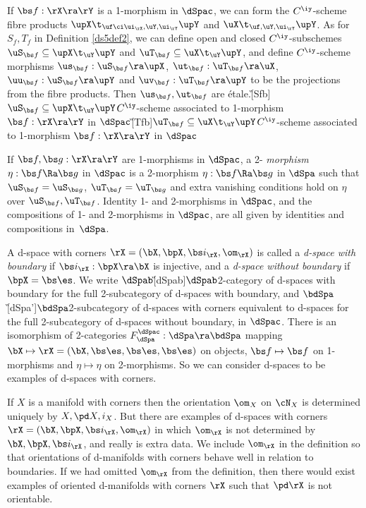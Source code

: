 \documentclass{article}
\begin{document}
If $\bs f:\rX\ra\rY$ is a 1-morphism in $\dSpac$, we can form the
$C^\iy$-scheme fibre products $\upX\t_{\uf\ci\ui_\rX,
\uY,\ui_\rY}\upY$ and $\uX\t_{\uf,\uY,\ui_\rY}\upY$. As for
$S_f,T_f$ in Definition \ref{ds5def2}, we can define open and closed
$C^\iy$-subschemes $\uS_{\bs f}\subseteq\upX\t_\uY\upY$ and
$\uT_{\bs f}\subseteq\uX\t_\uY\upY$, and define $C^\iy$-scheme
morphisms $\us_{\bs f}:\uS_{\bs f}\ra\upX$, $\ut_{\bs f}:\uT_{\bs
f}\ra\uX$, $\uu_{\bs f}:\uS_{\bs f}\ra\upY$ and $\uv_{\bs
f}:\uT_{\bs f}\ra\upY$ to be the projections from the fibre
products. Then $\us_{\bs f},\ut_{\bs f}$ are
\'etale.\G[Sfb]{$\uS_{\bs f}\subseteq\upX\t_\uY\upY$}{$C^\iy$-scheme
associated to 1-morphism $\bs f:\rX\ra\rY$ in
$\dSpac$}\G[Tfb]{$\uT_{\bs f}\subseteq\uX\t_\uY\upY$}{$C^\iy$-scheme
associated to 1-morphism $\bs f:\rX\ra\rY$ in $\dSpac$}

If $\bs f,\bs g:\rX\ra\rY$ are 1-morphisms in $\dSpac$, a 2-{\it
morphism\/} $\eta:\bs f\Ra\bs g$ in $\dSpac$ is a 2-morphism
$\eta:\bs f\Ra\bs g$ in $\dSpa$ such that $\uS_{\bs f}=\uS_{\bs g}$,
$\uT_{\bs f}=\uT_{\bs g}$ and extra vanishing conditions hold on
$\eta$ over $\uS_{\bs f},\uT_{\bs f}$. Identity 1- and 2-morphisms
in $\dSpac$, and the compositions of 1- and 2-morphisms in $\dSpac$,
are all given by identities and compositions
in~$\dSpa$.

A d-space with corners $\rX=(\bX,\bpX,\bs i_\rX,\om_\rX)$ is called
a {\it d-space with boundary\/} if $\bs
i_\rX:\bpX\ra\bX$ is injective, and a {\it d-space without
boundary\/} if $\bpX=\bs\es$. We write
$\dSpab$\G[dSpab]{$\dSpab$}{2-category of d-spaces with boundary}
for the full 2-subcategory of d-spaces with boundary, and
$\bdSpa$\G[dSpa']{$\bdSpa$}{2-subcategory of d-spaces with corners
equivalent to d-spaces} for the full 2-subcategory of d-spaces
without boundary, in $\dSpac$. There is an isomorphism of
2-categories $F_\dSpa^\dSpac:\dSpa\ra\bdSpa$ mapping
$\bX\mapsto\rX=(\bX,\bs\es,\bs\es,\bs\es)$ on objects, $\bs
f\mapsto\bs f$ on 1-morphisms and $\eta\mapsto\eta$ on 2-morphisms.
So we can consider d-spaces to be examples of d-spaces with
corners.

\begin{rem} If $X$ is a manifold with corners then the orientation
$\om_X$ on $\cN_X$ is determined uniquely by $X,\pd X,i_X$. But
there are examples of d-spaces with corners $\rX=(\bX,\bpX,\bs
i_\rX,\om_\rX)$ in which $\om_\rX$ is not determined by
$\bX,\bpX,\bs i_\rX$, and really is extra data. We include $\om_\rX$
in the definition so that orientations of d-manifolds with corners
behave well in relation to boundaries. If we had omitted $\om_\rX$
from the definition, then there would exist examples of oriented
d-manifolds with corners $\rX$ such that $\pd\rX$ is not orientable.
\label{ds6rem1}
\end{rem}
\end{document}
